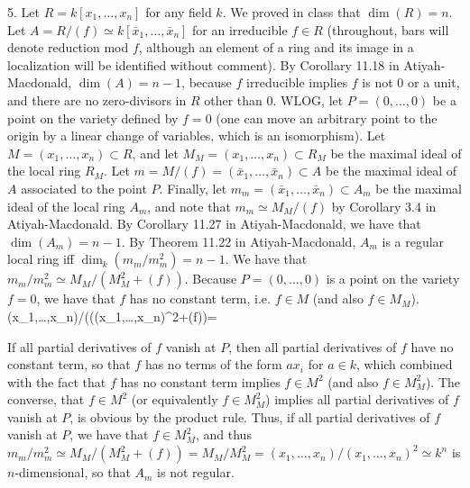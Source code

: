 \documentclass[11pt]{article}
\begin{document}
\num{5.} Let $R=k[x_1,\ldots,x_n]$ for any field $k$. We proved in class
that $\dim(R)=n$. Let $A=R/(f)\simeq k[\bar{x}_1,\ldots,\bar{x}_n]$ for an
irreducible $f\in R$ (throughout, bars will denote reduction mod $f$, although
an element of a ring and its image in a localization will be identified without
comment). By Corollary 11.18 in Atiyah-Macdonald, $\dim(A)=n-1$, because $f$
irreducible implies $f$ is not 0 or a unit, and there are no zero-divisors
in $R$ other than 0. WLOG, let $P=(0,\ldots,0)$ be a point on the variety
defined by $f=0$ (one can move an arbitrary point to the origin by a linear
change of variables, which is an isomorphism). Let $M=(x_1,\ldots,x_n)\subset
R$, and let $M_M=(x_1,\ldots,x_n)\subset R_M$ be the maximal ideal of
the local ring $R_M$. Let $m=M/(f)=(\bar{x}_1,\ldots,\bar{x}_n)\subset
A$ be the maximal ideal of $A$ associated to the point $P$. Finally, let
$m_m=(\bar{x}_1,\ldots,\bar{x}_n)\subset A_m$ be the maximal ideal of the
local ring $A_m$, and note that $m_m\simeq M_M/(f)$ by Corollary 3.4 in
Atiyah-Macdonald. By Corollary 11.27 in Atiyah-Macdonald, we have that
$\dim(A_m)=n-1$. By Theorem 11.22 in Atiyah-Macdonald, $A_m$ is a regular
local ring iff $\dim_k(m_m/m_m^2)=n-1$. We have that $m_m/m_m^2\simeq
M_M/(M_M^2+(f))$. Because $P=(0,\ldots,0)$ is a point on the variety $f=0$,
we have that $f$ has no constant term, i.e. $f\in M$ (and also $f\in M_M$). \\

(x_1,\ldots,x_n)/(((x_1,\ldots,x_n)^2+(f))=

If all partial derivatives of $f$ vanish at $P$, then all partial derivatives
of $f$ have no constant term, so that $f$ has no terms of the form $ax_i$
for $a\in k$, which combined with the fact that $f$ has no constant term
implies $f\in M^2$ (and also $f\in M_M^2$). The converse, that $f\in M^2$
(or equivalently $f\in M_M^2$) implies all partial derivatives of $f$ vanish
at $P$, is obvious by the product rule. Thus, if all partial derivatives
of $f$ vanish at $P$, we have that $f\in M_M^2$, and thus $m_m/m_m^2\simeq
M_M/(M_M^2+(f))=M_M/M_M^2=(x_1,\ldots,x_n)/(x_1,\ldots,x_n)^2\simeq k^n$
is $n$-dimensional, so that $A_m$ is not regular.\\
\end{document}
